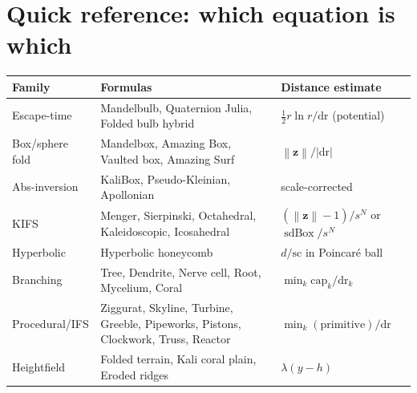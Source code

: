 \documentclass[10pt,a4paper]{article}
\newcommand{\vv}[1]{\mathbf{#1}}
\newcommand{\abs}[1]{\left|#1\right|}
\newcommand{\norm}[1]{\left\lVert#1\right\rVert}
\newcommand{\sdbox}{\operatorname{sdBox}}
\begin{document}
\appendix
\section{Quick reference: which equation is which}
\begin{center}\footnotesize
\begin{tabular}{@{}p{2.3cm}p{6.3cm}p{5.2cm}@{}}\toprule
Family & Formulas & Distance estimate\\\midrule
Escape-time & Mandelbulb, Quaternion Julia, Folded bulb hybrid & $\tfrac12 r\ln r/\mathrm{dr}$ (potential)\\
Box/sphere fold & Mandelbox, Amazing Box, Vaulted box, Amazing Surf & $\norm{\vv z}/\abs{\mathrm{dr}}$\\
Abs-inversion & KaliBox, Pseudo-Kleinian, Apollonian & scale-corrected\\
KIFS & Menger, Sierpinski, Octahedral, Kaleidoscopic, Icosahedral & $(\norm{\vv z}-1)/s^N$ or $\sdbox/s^N$\\
Hyperbolic & Hyperbolic honeycomb & $d/\mathrm{sc}$ in Poincar\'e ball\\
Branching & Tree, Dendrite, Nerve cell, Root, Mycelium, Coral & $\min_k \mathrm{cap}_k/\mathrm{dr}_k$\\
Procedural/IFS & Ziggurat, Skyline, Turbine, Greeble, Pipeworks, Pistons, Clockwork, Truss, Reactor & $\min_k(\text{primitive})/\mathrm{dr}$\\
Heightfield & Folded terrain, Kali coral plain, Eroded ridges & $\lambda(y-h)$\\
\bottomrule\end{tabular}
\end{center}
\end{document}
